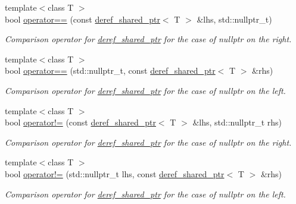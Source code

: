 \begin{DoxyCompactItemize}
{\footnotesize template$<$class T $>$ }\\bool \hyperlink{namespaceslb_1_1core_1_1util_a4e0953eb5fd3073c0057f7de724c0f91}{operator==} (const \hyperlink{classslb_1_1core_1_1util_1_1deref__shared__ptr}{deref\+\_\+shared\+\_\+ptr}$<$ T $>$ \&lhs, std\+::nullptr\+\_\+t)
\begin{DoxyCompactList}\small\item\em Comparison operator for \hyperlink{classslb_1_1core_1_1util_1_1deref__shared__ptr}{deref\+\_\+shared\+\_\+ptr} for the case of {\ttfamily nullptr} on the right. \end{DoxyCompactList}\item 
{\footnotesize template$<$class T $>$ }\\bool \hyperlink{namespaceslb_1_1core_1_1util_a8e196a0adbb3f886af645dc3bcc0c8f8}{operator==} (std\+::nullptr\+\_\+t, const \hyperlink{classslb_1_1core_1_1util_1_1deref__shared__ptr}{deref\+\_\+shared\+\_\+ptr}$<$ T $>$ \&rhs)
\begin{DoxyCompactList}\small\item\em Comparison operator for \hyperlink{classslb_1_1core_1_1util_1_1deref__shared__ptr}{deref\+\_\+shared\+\_\+ptr} for the case of {\ttfamily nullptr} on the left. \end{DoxyCompactList}\item 
{\footnotesize template$<$class T $>$ }\\bool \hyperlink{namespaceslb_1_1core_1_1util_a08e1702769bfbe3411dad3f0a68f526a}{operator!=} (const \hyperlink{classslb_1_1core_1_1util_1_1deref__shared__ptr}{deref\+\_\+shared\+\_\+ptr}$<$ T $>$ \&lhs, std\+::nullptr\+\_\+t rhs)
\begin{DoxyCompactList}\small\item\em Comparison operator for \hyperlink{classslb_1_1core_1_1util_1_1deref__shared__ptr}{deref\+\_\+shared\+\_\+ptr} for the case of {\ttfamily nullptr} on the right. \end{DoxyCompactList}\item 
{\footnotesize template$<$class T $>$ }\\bool \hyperlink{namespaceslb_1_1core_1_1util_a62443a5539cf3e36e67a7343806b65a3}{operator!=} (std\+::nullptr\+\_\+t lhs, const \hyperlink{classslb_1_1core_1_1util_1_1deref__shared__ptr}{deref\+\_\+shared\+\_\+ptr}$<$ T $>$ \&rhs)
\begin{DoxyCompactList}\small\item\em Comparison operator for \hyperlink{classslb_1_1core_1_1util_1_1deref__shared__ptr}{deref\+\_\+shared\+\_\+ptr} for the case of {\ttfamily nullptr} on the left. \end{DoxyCompactList}\item 

\end{DoxyCompactItemize}
